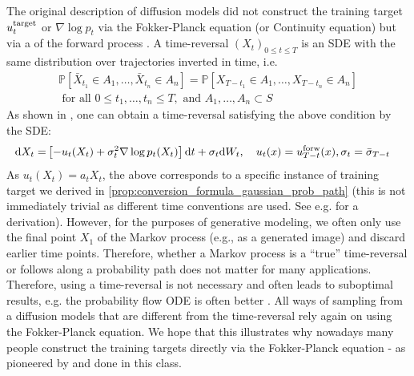 The original description of diffusion models did not construct the training target $u^{\text{target}}_t$ or $\nabla\log p_t$ via the Fokker-Planck equation (or Continuity equation) but via a  of the forward process \citep{anderson1982reverse}. A time-reversal $(X_t)_{0\leq t\leq T}$ is an SDE with the same distribution over trajectories inverted in time, i.e.
\begin{align}
\mathbb{P}[\bar{X}_{t_1}\in A_1,\dots,\bar{X}_{t_n}\in A_n]=\mathbb{P}[X_{T-t_1}\in A_1,\dots,X_{T-t_n}\in A_n]\\
    \text{ for all }0\leq t_1,\dots, t_n\leq T, \text{ and } A_1,\dots,A_n\subset S
\end{align}
As shown in \citet{anderson1982reverse}, one can obtain a time-reversal satisfying the above condition by the SDE:
\begin{align*}
    \mathrm{d} X_t =& \left[-u_t(X_t)+\sigma_t^2\nabla\log p_t(X_t)\right]\mathrm{d} t+ \sigma_{t}\mathrm{d} W_t,\quad u_t(x)=u^{\text{forw}}_{T-t}(x),\sigma_t=\bar{\sigma}_{T-t}
\end{align*}
As $u_t(X_t)=a_tX_t$, the above corresponds to a specific instance of training target we derived in \cref{prop:conversion_formula_gaussian_prob_path} (this is not immediately trivial as different time conventions are used. See e.g. \citep{lipman2024flow} for a derivation). However, for the purposes of generative modeling, we often only use the final point $X_1$ of the Markov process (e.g., as a generated image) and discard earlier time points. Therefore, whether a Markov process is a ``true'' time-reversal or follows along a probability path does not matter for many applications. Therefore, using a time-reversal is not necessary and often leads to suboptimal results, e.g. the probability flow ODE is often better \citep{karras2022elucidating, ma2024sit}. All ways of sampling from a diffusion models that are different from the time-reversal rely again on using the Fokker-Planck equation. We hope that this illustrates why nowadays many people construct the training targets directly via the Fokker-Planck equation - as pioneered by \citep{lipman2022flow,liu2022flow,albergo2023stochastic} and done in this class.

